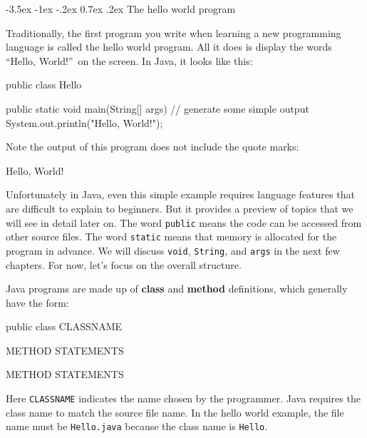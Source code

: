 \documentclass[12pt]{book}
\makeatletter
\theoremstyle{exercise}
\newcommand{\java}[1]{\verb"#1"}
\renewcommand{\section}{\@startsection{section}{1}{\z@}%
    {-3.5ex \@plus -1ex \@minus -.2ex}%
    {0.7ex \@plus.2ex}%
    {\normalfont\Large\bfseries}}
\newcommand{\java}[1]{\lstinline{#1}} %
\makeatother
\begin{document}
\section{The hello world program}
\label{sec:hello}


Traditionally, the first program you write when learning a new programming language is called the hello world program.
All it does is display the words ``Hello, World!''\ on the screen.
In Java, it looks like this:

\begin{code}
public class Hello {

    public static void main(String[] args) {
        // generate some simple output
        System.out.println("Hello, World!");
    }

}
\end{code}

Note the output of this program does not include the quote marks:

\begin{stdout}
Hello, World!
\end{stdout}


Unfortunately in Java, even this simple example requires language features that are difficult to explain to beginners.
But it provides a preview of topics that we will see in detail later on.
The word \java{public} means the code can be accessed from other source files.
The word \java{static} means that memory is allocated for the program in advance.
We will discuss \java{void}, \java{String}, and \java{args} in the next few chapters.
For now, let's focus on the overall structure.


Java programs are made up of {\bf class} and {\bf method} definitions, which generally have the form:

\begin{code}
public class CLASSNAME {

    METHOD {
        STATEMENTS
    }

    METHOD {
        STATEMENTS
    }

}
\end{code}


Here \java{CLASSNAME} indicates the name chosen by the programmer.
Java requires the class name to match the source file name.
In the hello world example, the file name must be {\tt Hello.java} because the class name is \java{Hello}.
\end{document}
